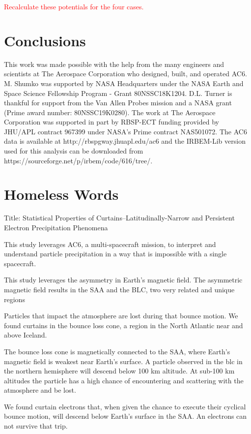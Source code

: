 \documentclass[draft]{agujournal2019}
\begin{document}
\textcolor{red}{Recalculate these potentials for the four cases.}


\section{Conclusions}


\acknowledgments
This work was made possible with the help from the many engineers and scientists at The Aerospace Corporation who designed, built, and operated AC6. M. Shumko was supported by NASA Headquarters under the NASA Earth and Space Science Fellowship Program - Grant 80NSSC18K1204. D.L. Turner is thankful for support from the Van Allen Probes mission and a NASA grant (Prime award number: 80NSSC19K0280). The work at The Aerospace Corporation was supported in part by RBSP-ECT funding provided by JHU/APL contract 967399 under NASA's Prime contract NAS501072. The AC6 data is available at http://rbspgway.jhuapl.edu/ac6 and the IRBEM-Lib version used for this analysis can be downloaded from https://sourceforge.net/p/irbem/code/616/tree/.

\section{Homeless Words}

Title: Statistical Properties of Curtains--Latitudinally-Narrow and Persistent Electron Precipitation Phenomena

This study leverages AC6, a multi-spacecraft mission, to interpret and understand particle precipitation in a way that is impossible with a single spacecraft.

This study leverages the asymmetry in Earth's magnetic field. The asymmetric magnetic field results in the SAA and the BLC, two very related and unique regions

Particles that impact the atmosphere are lost during that bounce motion. We found curtains in the bounce loss cone, a region in the North Atlantic near and above Iceland.

The bounce loss cone is magnetically connected to the SAA, where Earth's magnetic field is weakest near Earth's surface. A particle observed in the blc in the northern hemisphere will descend below 100 km altitude. At sub-100 km altitudes the particle has a high chance of encountering and scattering with the atmosphere and be lost. 

We found curtain electrons that, when given the chance to execute their cyclical bounce motion, will descend below Earth's surface in the SAA. An electrons can not survive that trip.
\end{document}
